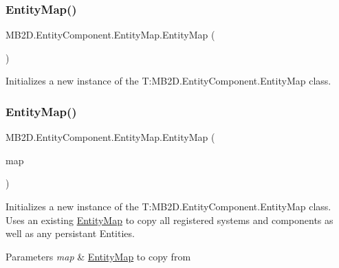 \subsubsection{\texorpdfstring{Entity\+Map()}{EntityMap()}\hspace{0.1cm}{\footnotesize\ttfamily [1/2]}}
{\footnotesize\ttfamily M\+B2\+D.\+Entity\+Component.\+Entity\+Map.\+Entity\+Map (\begin{DoxyParamCaption}{ }\end{DoxyParamCaption})\hspace{0.3cm}{\ttfamily [inline]}}



Initializes a new instance of the T\+:\+M\+B2\+D.\+Entity\+Component.\+Entity\+Map class. 

\hypertarget{class_m_b2_d_1_1_entity_component_1_1_entity_map_ac8f0662e42b90d8299e1044a1c429863}{}\label{class_m_b2_d_1_1_entity_component_1_1_entity_map_ac8f0662e42b90d8299e1044a1c429863} 
\subsubsection{\texorpdfstring{Entity\+Map()}{EntityMap()}\hspace{0.1cm}{\footnotesize\ttfamily [2/2]}}
{\footnotesize\ttfamily M\+B2\+D.\+Entity\+Component.\+Entity\+Map.\+Entity\+Map (\begin{DoxyParamCaption}\item[{\hyperlink{class_m_b2_d_1_1_entity_component_1_1_entity_map}{Entity\+Map}}]{map }\end{DoxyParamCaption})\hspace{0.3cm}{\ttfamily [inline]}}



Initializes a new instance of the T\+:\+M\+B2\+D.\+Entity\+Component.\+Entity\+Map class. Uses an existing \hyperlink{class_m_b2_d_1_1_entity_component_1_1_entity_map}{Entity\+Map} to copy all registered systems and components as well as any persistant Entities. 


\begin{DoxyParams}{Parameters}
{\em map} & \hyperlink{class_m_b2_d_1_1_entity_component_1_1_entity_map}{Entity\+Map} to copy from\\
\hline
\end{DoxyParams}



